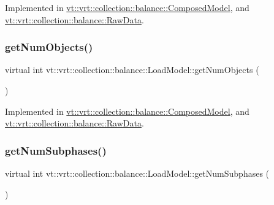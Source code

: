 Implemented in \hyperlink{classvt_1_1vrt_1_1collection_1_1balance_1_1_composed_model_a20736b80cf2b19d1a9352363b48039e0}{vt\+::vrt\+::collection\+::balance\+::\+Composed\+Model}, and \hyperlink{structvt_1_1vrt_1_1collection_1_1balance_1_1_raw_data_aac4d28d201499d9ed5a17080cb7f659b}{vt\+::vrt\+::collection\+::balance\+::\+Raw\+Data}.

\mbox{\label{classvt_1_1vrt_1_1collection_1_1balance_1_1_load_model_a87b90c2daf3a34243a7a2af266aa0b29}} 
\subsubsection{\texorpdfstring{get\+Num\+Objects()}{getNumObjects()}}
{\footnotesize\ttfamily virtual int vt\+::vrt\+::collection\+::balance\+::\+Load\+Model\+::get\+Num\+Objects (\begin{DoxyParamCaption}{ }\end{DoxyParamCaption})\hspace{0.3cm}{\ttfamily [pure virtual]}}



Implemented in \hyperlink{classvt_1_1vrt_1_1collection_1_1balance_1_1_composed_model_a7b383954706cb8069e841a87c3ff3f8f}{vt\+::vrt\+::collection\+::balance\+::\+Composed\+Model}, and \hyperlink{structvt_1_1vrt_1_1collection_1_1balance_1_1_raw_data_a586c3223d1f69ee9d5eb2930ff659051}{vt\+::vrt\+::collection\+::balance\+::\+Raw\+Data}.

\mbox{\label{classvt_1_1vrt_1_1collection_1_1balance_1_1_load_model_ab46ea62e4228d4a64de9dd0adfe81af2}} 
\subsubsection{\texorpdfstring{get\+Num\+Subphases()}{getNumSubphases()}}
{\footnotesize\ttfamily virtual int vt\+::vrt\+::collection\+::balance\+::\+Load\+Model\+::get\+Num\+Subphases (\begin{DoxyParamCaption}{ }\end{DoxyParamCaption})\hspace{0.3cm}{\ttfamily [pure virtual]}}



